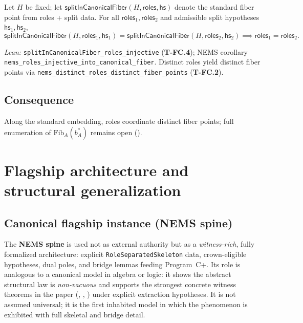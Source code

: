 \documentclass[11pt]{article}
\begin{document}
\begin{theorem}\label{thm:role-inject}
Let $H$ be fixed; let $\mathsf{splitInCanonicalFiber}(H,\mathsf{roles},\mathsf{hs})$ denote the standard fiber point from roles + split data. For all $\mathsf{roles}_1,\mathsf{roles}_2$ and admissible split hypotheses $\mathsf{hs}_1,\mathsf{hs}_2$,
\[
  \mathsf{splitInCanonicalFiber}(H,\mathsf{roles}_1,\mathsf{hs}_1) = \mathsf{splitInCanonicalFiber}(H,\mathsf{roles}_2,\mathsf{hs}_2)
  \implies \mathsf{roles}_1 = \mathsf{roles}_2.
\]
\end{theorem}
\noindent\emph{Lean:} \texttt{splitInCanonicalFiber\_roles\_injective} (\textbf{T-FC.4}); NEMS corollary \texttt{nems\_roles\_injective\_into\_canonical\_fiber}. Distinct roles yield distinct fiber points via \texttt{nems\_distinct\_roles\_distinct\_fiber\_points} (\textbf{T-FC.2}).

\subsection{Consequence}\label{sec:fiber-structure-interpretation}
Along the standard embedding, roles coordinate distinct fiber points; full enumeration of $\mathrm{Fib}_A(b^\ast_A)$ remains open ().

\section{Flagship architecture and structural generalization}\label{sec:flagship}

\subsection{Canonical flagship instance (NEMS spine)}\label{sec:flagship-instance}
The \textbf{NEMS spine} is used not as external authority but as a \emph{witness-rich}, fully formalized architecture: explicit \texttt{RoleSeparatedSkeleton} data, crown-eligible hypotheses, dual poles, and bridge lemmas feeding Program~C+. Its role is analogous to a canonical model in algebra or logic: it shows the abstract structural law is \emph{non-vacuous} and supports the strongest concrete witness theorems in the paper (, , ) under explicit extraction hypotheses. It is not assumed universal; it is the first inhabited model in which the phenomenon is exhibited with full skeletal and bridge detail.
\end{document}
